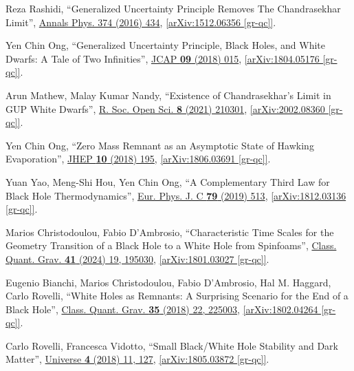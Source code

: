 \documentclass[12pt,preprintnumbers, floatfix, preprintnumbers, letterpaper, superscriptaddress,nofootinbib]{revtex4-2}
\begin{document}
\begin{thebibliography}{99}
Reza Rashidi, ``Generalized Uncertainty Principle Removes The Chandrasekhar Limit'', {\href{https://linkinghub.elsevier.com/retrieve/pii/S0003491616301890}{Annals Phys. 374 (2016) 434}}, \href{https://arxiv.org/abs/1512.06356}{[arXiv:1512.06356 [gr-qc]]}.

Yen Chin Ong, ``Generalized Uncertainty Principle, Black Holes, and White Dwarfs: A Tale of Two Infinities'', {\href{https://iopscience.iop.org/article/10.1088/1475-7516/2018/09/015}{JCAP \textbf{09} (2018) 015}}, \href{https://arxiv.org/abs/1804.05176}{[arXiv:1804.05176 [gr-qc]]}.

Arun Mathew, Malay Kumar Nandy, ``Existence of Chandrasekhar’s Limit in GUP White Dwarfs'', {\href{https://royalsocietypublishing.org/doi/10.1098/rsos.210301}{R. Soc. Open Sci. \textbf{8} (2021) 210301}},  \href{https://arxiv.org/abs/2002.08360}{[arXiv:2002.08360 [gr-qc]]}.

Yen Chin Ong, ``Zero Mass Remnant as an Asymptotic State of Hawking Evaporation'', 	{\href{https://link.springer.com/article/10.1007/JHEP10(2018)195}{JHEP \textbf{10} (2018) 195}}, \href{https://arxiv.org/abs/1806.03691}{[arXiv:1806.03691 [gr-qc]]}.

Yuan Yao, Meng-Shi Hou, Yen Chin Ong, ``A Complementary Third Law for Black Hole Thermodynamics'', 	{\href{https://link.springer.com/article/10.1140/epjc/s10052-019-7003-1}{Eur. Phys. J. C \textbf{79} (2019) 513}}, \href{https://arxiv.org/abs/1812.03136}{[arXiv:1812.03136 [gr-qc]]}.

Marios Christodoulou, Fabio D'Ambrosio, ``Characteristic Time Scales for the Geometry Transition of a Black Hole to a White Hole from Spinfoams'', {\href{https://iopscience.iop.org/article/10.1088/1361-6382/ad6059}{Class. Quant. Grav. \textbf{41} (2024) 19, 195030}}, \href{https://arxiv.org/abs/1801.03027}{[arXiv:1801.03027 [gr-qc]]}.

Eugenio Bianchi, Marios Christodoulou, Fabio D'Ambrosio, Hal M. Haggard, Carlo Rovelli, ``White Holes as Remnants: A Surprising Scenario for the End of a Black Hole'', {\href{https://iopscience.iop.org/article/10.1088/1361-6382/aae550}{Class. Quant. Grav. \textbf{35} (2018) 22, 225003}}, \href{https://arxiv.org/abs/1802.04264}{[arXiv:1802.04264 [gr-qc]]}.

Carlo Rovelli, Francesca Vidotto, ``Small Black/White Hole Stability and Dark Matter'', {\href{https://www.mdpi.com/2218-1997/4/11/127}{Universe \textbf{4} (2018) 11, 127}}, \href{https://arxiv.org/abs/1805.03872}{[arXiv:1805.03872 [gr-qc]]}.


\end{thebibliography}
\end{document}
